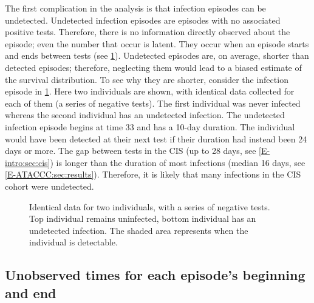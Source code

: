 \documentclass[thesis.tex]{subfiles}
\begin{document}
The first complication in the analysis is that infection episodes can be undetected.
Undetected infection episodes are episodes with no associated positive tests.
Therefore, there is no information directly observed about the episode; even the number that occur is latent.
They occur when an episode starts and ends between tests (see \cref{perf-test:fig:truncation}).
Undetected episodes are, on average, shorter than detected episodes; therefore, neglecting them would lead to a biased estimate of the survival distribution.
To see why they are shorter, consider the infection episode in \cref{perf-test:fig:truncation}.
Here two individuals are shown, with identical data collected for each of them (a series of negative
 tests).
The first individual was never infected whereas the second individual has an undetected infection. 
The undetected infection episode begins at time 33 and has a 10-day duration.
The individual would have been detected at their next test if their duration had instead been 24 days or more.
The gap between tests in the CIS (up to 28 days, see \cref{E-intro:sec:cis}) is longer than the duration of most infections (median 16 days, see \cref{E-ATACCC:sec:results}).
Therefore, it is likely that many infections in the CIS cohort were undetected.
\begin{figure}
  \caption[Undetected episodes in CIS data]{%
    Identical data for two individuals, with a series of negative tests.
    Top individual remains uninfected, bottom individual has an undetected infection.
    The shaded area represents when the individual is detectable.
  }
  \label{perf-test:fig:truncation}
\end{figure}

\subsection{Unobserved times for each episode's beginning and end} \label{perf-test:sec:interval-censoring}
\end{document}
